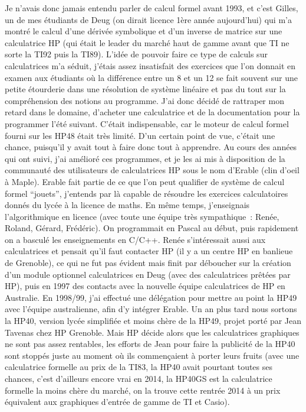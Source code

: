 \documentclass[a4paper,11pt]{article}
\begin{document}
\begin{giacjshere}
Je n'avais donc jamais entendu parler de calcul formel
avant 1993, et c'est Gilles, un de mes \'etudiants de Deug (on
dirait licence 1\`ere ann\'ee aujourd'hui) qui m'a montr\'e
le calcul d'une d\'eriv\'ee symbolique et d'un inverse
de matrice sur une calculatrice HP (qui \'etait le leader du march\'e
haut de gamme avant que TI ne sorte la TI92 puis la TI89).
L'id\'ee de pouvoir faire ce type de calculs sur calculatrices
m'a s\'eduit, j'\'etais assez insatisfait des exercices
que l'on donnait en examen aux \'etudiants o\`u la
diff\'erence entre un 8 et un 12 se fait souvent sur une petite
\'etourderie dans une r\'esolution de syst\`eme lin\'eaire
et pas du tout sur la compr\'ehension des notions au programme.
J'ai donc d\'ecid\'e de rattraper mon retard dans le domaine,
d'acheter une calculatrice et de la documentation pour la
programmer l'\'et\'e suivant. C'\'etait indispensable, car le moteur
de calcul formel fourni sur les HP48 \'etait tr\`es limit\'e. D'un
certain point de vue, c'\'etait une chance, puisqu'il y avait
tout \`a faire donc tout \`a apprendre.
Au cours des ann\'ees qui ont suivi, j'ai am\'elior\'e ces programmes,
et je les ai mis \`a disposition de la communaut\'e des utilisateurs
de calculatrices HP sous le nom d'Erable (clin d'oeil \`a Maple).
Erable fait partie de ce que l'on peut qualifier de syst\`eme de
calcul formel ``jouets'', j'entends par l\`a capable de r\'esoudre
les exercices calculatoires donn\'es du lyc\'ee \`a la licence de maths.
En m\^eme temps, j'enseignais
l'algorithmique en licence (avec toute
une \'equipe tr\`es sympathique~: Ren\'ee, Roland,
G\'erard, Fr\'ed\'eric). On programmait en Pascal au d\'ebut, puis
rapidement on a bascul\'e les enseignements en C/C++.
Ren\'ee s'int\'eressait
aussi aux calculatrices et pensait qu'il faut contacter HP (il
y a un centre HP en banlieue de Grenoble),
ce qui ne fut pas \'evident mais finit par d\'eboucher sur
la cr\'eation d'un module optionnel calculatrices en Deug
(avec des calculatrices pr\^et\'ees par HP),
puis en 1997 des contacts avec la nouvelle \'equipe calculatrices
de HP en Australie. En 1998/99, j'ai effectu\'e une d\'el\'egation
pour mettre au point la HP49 avec l'\'equipe australienne,
afin d'y intégrer Erable.
Un an plus tard nous sortons
la HP40, version lyc\'ee simplifi\'ee et moins ch\`ere de la HP49,
projet port\'e par Jean Tavenas chez HP Grenoble.
Mais HP d\'ecide alors que les calculatrices graphiques
ne sont pas assez rentables, les efforts de Jean pour
faire la publicit\'e de la HP40 sont stopp\'es juste au
moment o\`u ils commen\c{c}aient \`a porter leurs fruits
(avec une calculatrice formelle au prix de la TI83,
la HP40 avait pourtant toutes ses chances, c'est
d'ailleurs encore vrai en 2014,
la HP40GS est la calculatrice formelle
la moins ch\`ere du march\'e, on la trouve cette rentr\'ee 2014
\`a un prix \'equivalent aux graphiques d'entr\'ee de gamme de TI et Casio).


\end{giacjshere}
\end{document}
